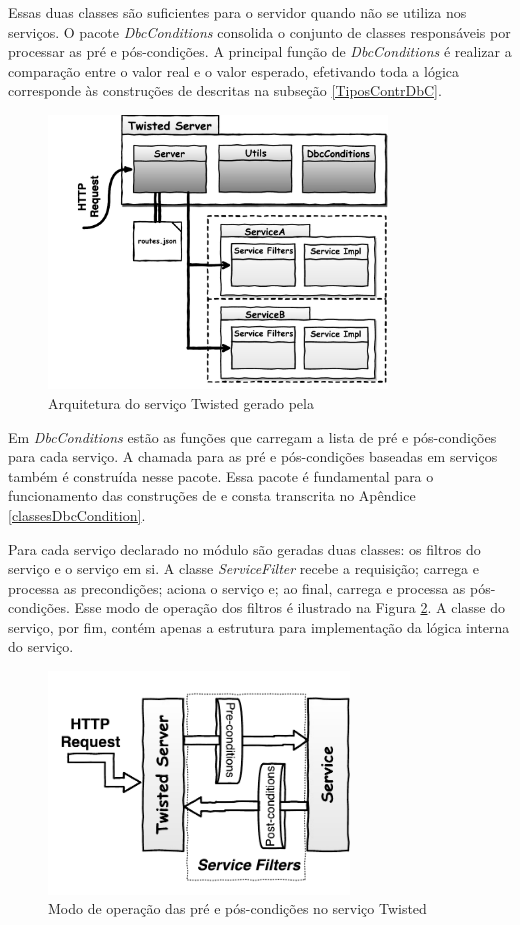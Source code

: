 Essas duas classes são suficientes para o servidor quando não se utiliza
\designbycontract{} nos serviços. O pacote
\emph{DbcConditions} consolida o conjunto de classes responsáveis por processar
as pré e pós-condições. A principal função de \emph{DbcConditions} é realizar a
comparação entre o valor real e o valor esperado, efetivando toda a
lógica corresponde às construções de \designbycontract{} descritas na subseção
\ref{TiposContrDbC}.

\begin{figure}[htb]
\centering
\includegraphics[width=90mm,trim = 18mm 4mm 0mm
0mm,clip]{img/TwistedServer.pdf}
\caption{Arquitetura do serviço Twisted gerado pela \neoidl{}}
\label{Fig:TwistedArchtecture}
\end{figure}

Em \emph{DbcConditions} estão as funções que carregam a lista de pré e
pós-condições para cada serviço. A chamada para as pré e pós-condições baseadas
em serviços também é construída nesse pacote. Essa pacote é fundamental para o
funcionamento das construções de \designbycontract{} e consta transcrita no
Apêndice \ref{classesDbcCondition}.

Para cada serviço declarado no módulo \neoidl{} são geradas duas classes: os
filtros do serviço e o serviço em si. A classe \emph{ServiceFilter} recebe a
requisição; carrega e processa as precondições; aciona o serviço e; ao final,
carrega e processa as pós-condições. Esse modo de operação dos filtros é
ilustrado na Figura \ref{Fig:TwistedFiltes}. A classe do serviço, por
fim, contém apenas a estrutura para implementação da lógica interna do serviço.

\begin{figure}[!htb]
\centering
\includegraphics[width=80mm,trim = 5mm 6mm 0mm 
3mm,clip]{img/TwistedFilters.pdf}
\caption{Modo de operação das pré e pós-condições no serviço Twisted}
\label{Fig:TwistedFiltes}
\end{figure}



